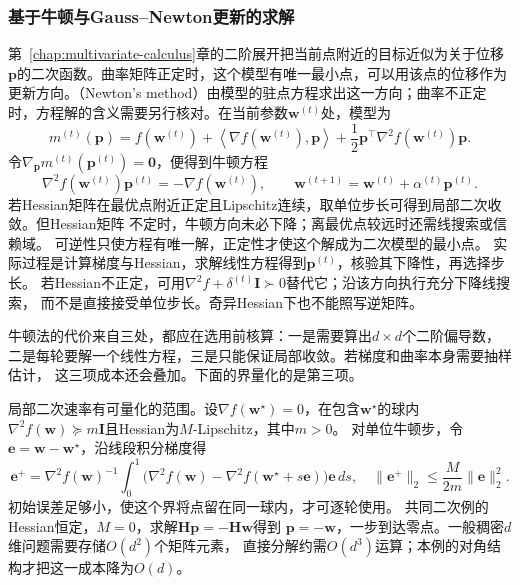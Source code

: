 \subsubsection{基于牛顿与Gauss–Newton更新的求解}
\label{sec:opt-newton-gauss-newton}

第~\ref{chap:multivariate-calculus}章的二阶展开把当前点附近的目标近似为关于位移$\bm p$的二次函数。曲率矩阵正定时，这个模型有唯一最小点，可以用该点的位移作为更新方向。（Newton's method）由模型的驻点方程求出这一方向；曲率不正定时，方程解的含义需要另行核对。在当前参数$\bm w^{(t)}$处，模型为
\[
  m^{(t)}(\bm{p})
  =
  f(\bm{w}^{(t)})
  +\left\langle\nabla f(\bm{w}^{(t)}),\bm{p}\right\rangle
  +\frac12\bm{p}^{\top}\nabla^2f(\bm{w}^{(t)})\bm{p}.
\]
令$\nabla_{\bm{p}}m^{(t)}(\bm{p}^{(t)})=\bm{0}$，便得到牛顿方程
\[
  \nabla^2 f(\bm{w}^{(t)})\bm{p}^{(t)}
  =-\nabla f(\bm{w}^{(t)}),\qquad
  \bm{w}^{(t+1)}=\bm{w}^{(t)}+\alpha^{(t)}\bm{p}^{(t)}.
\]
若Hessian矩阵在最优点附近正定且Lipschitz连续，取单位步长可得到局部二次收敛。但Hessian矩阵
不定时，牛顿方向未必下降；离最优点较远时还需线搜索或信赖域。
可逆性只使方程有唯一解，正定性才使这个解成为二次模型的最小点。
实际过程是计算梯度与Hessian，求解线性方程得到$\bm p^{(t)}$，核验其下降性，再选择步长。
若Hessian不正定，可用$\nabla^2f+\delta^{(t)}\bm I\succ0$替代它；沿该方向执行充分下降线搜索，
而不是直接接受单位步长。奇异Hessian下也不能照写逆矩阵。

牛顿法的代价来自三处，都应在选用前核算：一是需要算出$d\times d$个二阶偏导数，
二是每轮要解一个线性方程，三是只能保证局部收敛。若梯度和曲率本身需要抽样估计，
这三项成本还会叠加。下面的界量化的是第三项。

局部二次速率有可量化的范围。设$\nabla f(\bm w^\star)=0$，在包含$\bm w^\star$的球内
$\nabla^2f(\bm w)\succeq m\bm I$且Hessian为$M$-Lipschitz，其中$m>0$。
对单位牛顿步，令$\bm e=\bm w-\bm w^\star$，沿线段积分梯度得
\[
 \bm e^+
 =\nabla^2f(\bm w)^{-1}\!
 \int_0^1\bigl(\nabla^2f(\bm w)-\nabla^2f(\bm w^\star+s\bm e)\bigr)\bm e\,ds,
 \quad
 \|\bm e^+\|_2\leq\frac{M}{2m}\|\bm e\|_2^2.
\]
初始误差足够小，使这个界将点留在同一球内，才可逐轮使用。
共同二次例的Hessian恒定，$M=0$，求解$\bm H\bm p=-\bm H\bm w$得到
$\bm p=-\bm w$，一步到达零点。一般稠密$d$维问题需要存储$O(d^2)$个矩阵元素，
直接分解约需$O(d^3)$运算；本例的对角结构才把这一成本降为$O(d)$。

